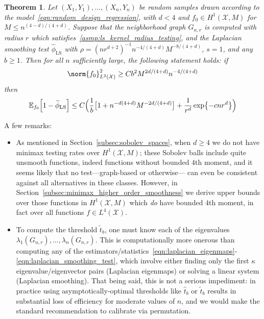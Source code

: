\documentclass{article}
\newcommand{\1}{\mathbf{1}}
\newcommand{\Xset}{\mathcal{X}}
\newcommand{\Leb}{L}
\newcommand{\Ebb}{\mathbb{E}}
\newcommand{\wt}[1]{\widetilde{#1}}
\newcommand{\wh}[1]{\widehat{#1}}
\newcommand{\LS}{\mathrm{LS}}
\theoremstyle{alden}
\theoremstyle{aldenthm}
\newtheorem{theorem}{Theorem}
\theoremstyle{definition}
\theoremstyle{remark}
\begin{document}
\begin{theorem}
	\label{thm:laplacian_smoothing_testing1}
	Let $(X_1,Y_1),\ldots,(X_n,Y_n)$ be random samples drawn according to the model~\eqref{eqn:random_design_regression}, with $d < 4$ and $f_0 \in H^1(\Xset,M)$ for $M \leq n^{(4 - d)/(4 + d)}$. Suppose that the neighborhood graph $G_{n,r}$ is computed with radius $r$ which satisfies~\ref{asmp:ls_kernel_radius_testing}, and the Laplacian smoothing test $\wh{\phi}_{\LS}$ with $\rho = (nr^{d + 2})^{-1} n^{-4/(4 + d)} M^{-8/(4 + d)}$, $s = 1$, and any $b \geq 1$. Then for all $n$ sufficiently large, the following statement holds: if
	\begin{equation}
	\label{eqn:laplacian_smoothing_testing1}
	\norm{f_0}_{\Leb^2(\Xset)}^2 \geq C b^2 M^{2d/(4 + d)} n^{-4/(4 + d)}
	\end{equation} 
	then
	\begin{equation*}
	\Ebb_{f_0}\Bigl[1 - \wt{\phi}_{\LS} \Bigr] \leq C\Bigl(\frac{1}{b}\bigl[1 + n^{-d(4 + d)}M^{-2d/(4 + d)}\bigr] + \frac{1}{r^d}\exp\bigl\{-cnr^d\bigr\}\Bigr)
	\end{equation*}
\end{theorem}

A few remarks:
\begin{itemize}
	\item As mentioned in Section~\ref{subsec:sobolev_spaces}, when $d \geq 4$ we do not have minimax testing rates over $H^1(\Xset,M)$; these Sobolev balls include quite unsmooth functions, indeed functions without bounded $4$th moment, and it seems likely that no test---graph-based or otherwise--- can even be consistent against all alternatives in these classes. However, in Section~\ref{subsec:minimax_higher_order_smoothness} we derive upper bounds over those functions in $H^1(\Xset,M)$ which \emph{do} have bounded $4$th moment, in fact over all functions $f \in \Leb^4(\Xset)$.
	\item To compute the threshold $\wt{t}_b$, one must know each of the eigenvalues $\lambda_1(G_{n,r}),\ldots,\lambda_n(G_{n,r})$. This is computationally more onerous than computing any of the estimators/statistics~\eqref{eqn:laplacian_eigenmaps}-\eqref{eqn:laplacian_smoothing_test}, which involve either finding only the first $\kappa$ eigenvalue/eigenvector pairs (Laplacian eigenmaps) or solving a linear system (Laplacian smoothing). That being said, this is not a serious impediment: in practice using asymptotically-optimal thresholds like $\wh{t}_b$ or $\wt{t}_b$ results in substantial loss of efficiency for moderate values of $n$, and we would make the standard recommendation to calibrate via permutation. 
\end{itemize}
\end{document}
